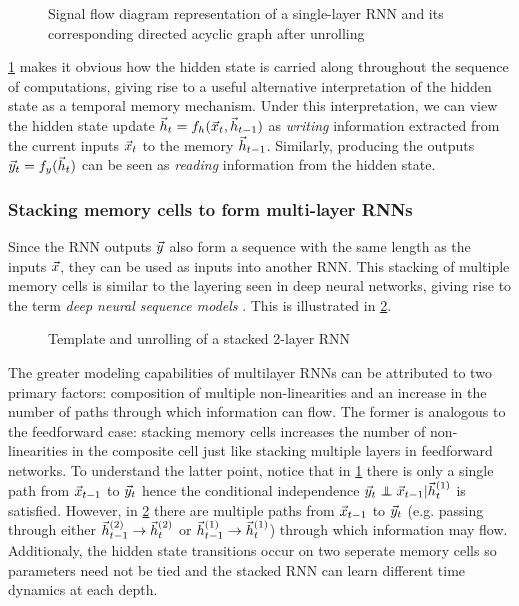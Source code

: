 \begin{figure}[htpb]
    \centering
    \resizebox{4.5in}{!}{}
    \caption{Signal flow diagram representation of a single-layer RNN and its corresponding directed acyclic graph after unrolling}
    \label{fig:rnn-single-unrolled}
\end{figure}

\cref{fig:rnn-single-unrolled} makes it obvious how the hidden state is
carried along throughout the sequence of computations, giving rise to a useful
alternative interpretation of the hidden state as a temporal memory mechanism.
Under this interpretation, we can view the hidden state update $\vec{h}_t = f_h
(\vec{x}_t, \vec{h}_{t-1})$ as \emph{writing} information extracted from the
current inputs $\vec{x}_t$ to the memory $\vec{h}_{t-1}$. Similarly, producing
the outputs $\vec{y}_t = f_y (\vec{h}_t)$ can be seen as \emph{reading}
information from the hidden state.


\subsubsection{Stacking memory cells to form multi-layer RNNs}

Since the RNN outputs $\vec{y}$ also form a sequence with the same length as
the inputs $\vec{x}$, they can be used as inputs into another RNN. This
stacking of multiple memory cells is similar to the layering seen in deep
neural networks, giving rise to the term \emph{deep neural sequence models}
. This is illustrated in \cref{fig:rnn-multi-unrolled}.

\begin{figure}[htpb]
    \centering
    \resizebox{4.5in}{!}{}
    \caption{Template and unrolling of a stacked 2-layer RNN}
    \label{fig:rnn-multi-unrolled}
\end{figure}

The greater modeling capabilities of multilayer RNNs can be attributed to two
primary factors: composition of multiple non-linearities and an increase in the
number of paths through which information can flow. The former is analogous to
the feedforward case: stacking memory cells increases the number of
non-linearities in the composite cell just like stacking multiple layers in
feedforward networks. To understand the latter point, notice that in
\cref{fig:rnn-single-unrolled} there is only a single path from
$\vec{x}_{t-1}$ to $\vec{y}_{t}$ hence the conditional independence
$\y_{t} \independent \x_{t-1} | \h^{(1)}_t$ is satisfied.
However, in \cref{fig:rnn-multi-unrolled} there are multiple paths from
$\vec{x}_{t-1}$ to $\vec{y}_{t}$ (e.g. passing through either
$\vec{h}^{(2)}_{t-1} \to \vec{h}^{(2)}_t$ or $\vec{h}^{(1)}_{t-1} \to
\vec{h}^{(1)}_t$) through which information may flow. Additionaly, the
hidden state transitions occur on two seperate memory cells so parameters
need not be tied and the stacked RNN can learn different time dynamics
at each depth.


